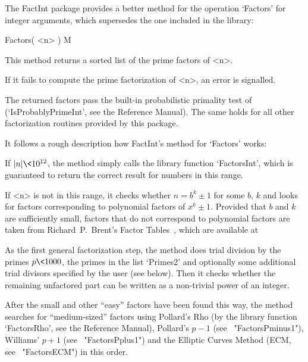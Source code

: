 

The FactInt package provides a better method for the operation `Factors'
for integer arguments, which supersedes the one included in the {\GAP}
library:

\>Factors( <n> ) M

This method returns a sorted list of the prime factors of <n>.

If it fails to compute the prime factorization of <n>, an error is
signalled.

The returned factors pass the built-in probabilistic primality test of
{\GAP} (`IsProbablyPrimeInt', see the {\GAP} Reference Manual).
The same holds for all other factorization routines provided by this
package.

It follows a rough description how FactInt's method for `Factors' works:

If $|n| \< 10^{12}$, the method simply calls the library function
`FactorsInt', which is guaranteed to return the correct result for
numbers in this range.

If <n> is not in this range, it checks whether $n = b^k \pm 1$ for 
some $b$, $k$ and looks for factors corresponding to polynomial factors
of $x^k \pm 1$. Provided that $b$ and $k$ are sufficiently small,
factors that do not correspond to polynomial factors are taken from
Richard~P.~Brent's Factor Tables~\cite{Brent04}, which are available at


As the first general factorization step, the method does 
trial division by the primes $p \< 1000$, the primes in the list
`Primes2' and optionally some additional trial divisors specified by the
user (see below). Then it checks whether the remaining unfactored part
can be written as a non-trivial power of an integer.

After the small and other ``easy'' factors have been found this way,
the method searches for ``medium-sized'' factors using Pollard's Rho
(by the library function `FactorsRho', see the {\GAP} Reference Manual),
Pollard's $p-1$ (see ~"FactorsPminus1"), Williams' $p+1$
(see ~"FactorsPplus1") and the Elliptic Curves Method
(ECM, see ~"FactorsECM") in this order.

